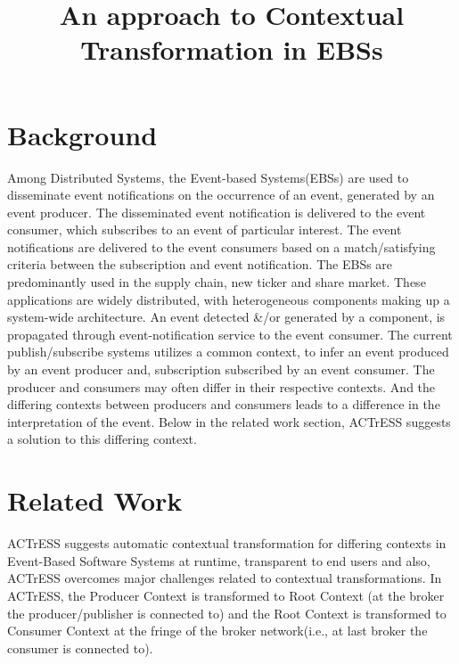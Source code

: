 \documentclass[authoryear,preprint]{sigplanconf}
\begin{document}
\setlength{\pdfpageheight}{\paperheight}
\setlength{\pdfpagewidth}{\paperwidth}


\title{An approach to Contextual Transformation in EBSs}


\maketitle




\section{Background}
\label{sec:Background}

Among Distributed Systems, the Event-based Systems(EBSs) are used to disseminate event
notifications on the occurrence of an event, generated by an event producer. The disseminated
event notification is delivered to the event consumer, which subscribes to an event of particular
interest. The event notifications are delivered to the event consumers based on a match/satisfying
criteria between the subscription and event notification. The EBSs are predominantly used in the
supply chain, new ticker and share market. These applications are widely distributed, with
heterogeneous components making up a system-wide architecture. An event detected \&/or generated
by a component, is propagated through event-notification service to the event consumer. The
current publish/subscribe systems utilizes a common context, to infer an event produced by an event
producer and, subscription subscribed by an event consumer. The producer and consumers may
often differ in their respective contexts. And the differing contexts between producers and
consumers leads to a difference in the interpretation of the event. Below in the related work section,
ACTrESS suggests a solution to this differing context.


\section{Related Work}
\label{sec:Related Work}

ACTrESS suggests automatic contextual transformation for differing contexts in Event-Based
Software Systems at runtime, transparent to end users and also, ACTrESS overcomes major
challenges related to contextual transformations. In ACTrESS, the Producer Context is transformed
to Root Context (at the broker the producer/publisher is connected to) and the Root Context is
transformed to Consumer Context at the fringe of the broker network(i.e., at last broker the
consumer is connected to).
\end{document}
